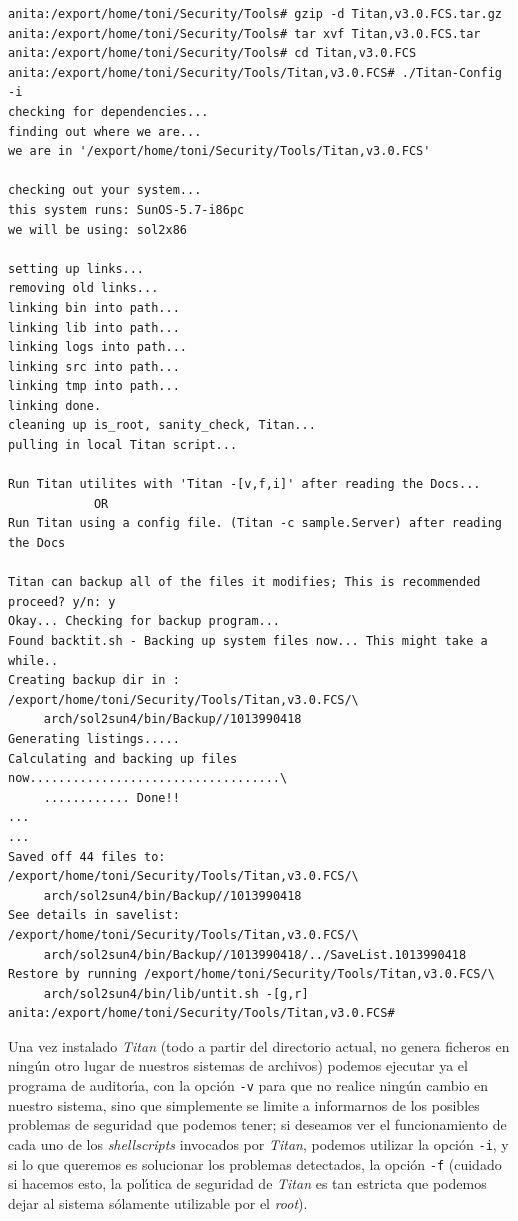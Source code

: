 \begin{verbatim}
anita:/export/home/toni/Security/Tools# gzip -d Titan,v3.0.FCS.tar.gz
anita:/export/home/toni/Security/Tools# tar xvf Titan,v3.0.FCS.tar
anita:/export/home/toni/Security/Tools# cd Titan,v3.0.FCS
anita:/export/home/toni/Security/Tools/Titan,v3.0.FCS# ./Titan-Config -i
checking for dependencies...
finding out where we are...
we are in '/export/home/toni/Security/Tools/Titan,v3.0.FCS'

checking out your system...
this system runs: SunOS-5.7-i86pc
we will be using: sol2x86

setting up links...
removing old links...
linking bin into path...
linking lib into path...
linking logs into path...
linking src into path...
linking tmp into path...
linking done.
cleaning up is_root, sanity_check, Titan...
pulling in local Titan script...
 
Run Titan utilites with 'Titan -[v,f,i]' after reading the Docs...
			OR
Run Titan using a config file. (Titan -c sample.Server) after reading the Docs  
 
Titan can backup all of the files it modifies; This is recommended
proceed? y/n: y
Okay... Checking for backup program...
Found backtit.sh - Backing up system files now... This might take a while..
Creating backup dir in : /export/home/toni/Security/Tools/Titan,v3.0.FCS/\
     arch/sol2sun4/bin/Backup//1013990418
Generating listings.....
Calculating and backing up files now...................................\
     ............ Done!!
...
...
Saved off 44 files to: /export/home/toni/Security/Tools/Titan,v3.0.FCS/\
     arch/sol2sun4/bin/Backup//1013990418
See details in savelist: /export/home/toni/Security/Tools/Titan,v3.0.FCS/\
     arch/sol2sun4/bin/Backup//1013990418/../SaveList.1013990418
Restore by running /export/home/toni/Security/Tools/Titan,v3.0.FCS/\
     arch/sol2sun4/bin/lib/untit.sh -[g,r]
anita:/export/home/toni/Security/Tools/Titan,v3.0.FCS# 
\end{verbatim}
Una vez instalado {\it Titan} (todo a partir del directorio actual, no genera
ficheros en ning\'un otro lugar de nuestros sistemas de archivos) podemos
ejecutar ya el programa de auditor\'{\i}a, con la opci\'on {\tt -v} para que no
realice ning\'un cambio en nuestro sistema, sino que simplemente se limite a
informarnos de los posibles problemas de seguridad que podemos tener; si 
deseamos ver el funcionamiento de cada uno de los {\it shellscripts} invocados
por {\it Titan}, podemos utilizar la opci\'on {\tt -i}, y si lo que queremos
es solucionar los problemas detectados, la opci\'on {\tt -f} (cuidado si 
hacemos esto, la pol\'{\i}tica de seguridad de {\it Titan} es tan estricta que
podemos dejar al sistema s\'olamente utilizable por el {\it root}).
